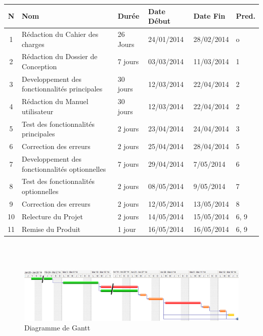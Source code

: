 \documentclass[11pt]{article}
\begin{document}
\vspace{0,5cm}
\small
\begin{tabular}{|c|l|l|l|l|l|}
    \hline
	\textbf{N} & \textbf{Nom} & \textbf{Durée} & \textbf{Date Début} & \textbf{Date Fin} & \textbf{Pred.}\\
	\hline
    \hline

		1 & Rédaction du Cahier des charges 					& 26 Jours 	& 24/01/2014 & 28/02/2014 	& o		\\ \cline{1-6}
		2 & Rédaction du Dossier de Conception 					& 7 jours 	& 03/03/2014 & 11/03/2014 	& 1  	\\	\cline{1-6}	
    	3 & Developpement des fonctionnalités principales		& 30 jours 	& 12/03/2014 & 22/04/2014 	& 2 	\\	\cline{1-6}	
		4 & Rédaction du Manuel utilisateur 					& 30 jours 	& 12/03/2014 & 22/04/2014 	& 2  	\\	\cline{1-6}	
		5 & Test des fonctionnalités principales				& 2 jours 	& 23/04/2014 & 24/04/2014 	& 3  	\\	\cline{1-6}
        6 & Correction des erreurs 								& 2 jours 	& 25/04/2014 & 28/04/2014 	& 5		\\ \cline{1-6}
        7 & Developpement des fonctionnalités optionnelles 		& 7 jours 	& 29/04/2014 & 7/05/2014 	& 6 	\\ \cline{1-6}
        8 & Test des fonctionnalités optionnelles 				& 2 jours 	& 08/05/2014 & 9/05/2014 	& 7 	\\ \cline{1-6}
        9 & Correction des erreurs 								& 2 jours 	& 12/05/2014 & 13/05/2014 	& 8 	\\ \cline{1-6}
       10 & Relecture du Projet 								& 2 jours 	& 14/05/2014 & 15/05/2014 	& 6, 9 	\\ \cline{1-6}
       11 & Remise du Produit 									& 1 jour 	& 16/05/2014 & 16/05/2014 	& 6, 9 	\\ \cline{1-6}

	\hline
\end{tabular}
\normalsize 
\\
\\
\begin{figure}[!ht]
		\centering
		\includegraphics[width=17cm]{./Diagrammes/DiagrammeGantt.png}
		\caption{Diagramme de Gantt}
\end{figure}
\end{document}
